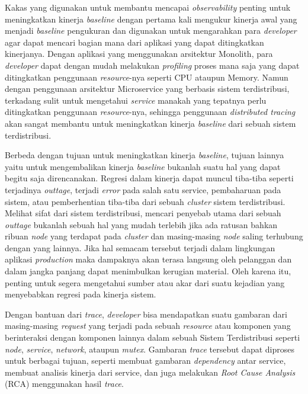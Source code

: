 Kakas yang digunakan untuk membantu mencapai \textit{observability} penting untuk meningkatkan kinerja \textit{baseline} dengan pertama kali mengukur kinerja awal yang menjadi \textit{baseline} pengukuran dan digunakan untuk mengarahkan para \textit{developer} agar dapat mencari bagian mana dari aplikasi yang dapat ditingkatkan kinerjanya. Dengan aplikasi yang menggunakan arsitektur Monolith, para \textit{developer} dapat dengan mudah melakukan \textit{profiling} proses mana saja yang dapat ditingkatkan penggunaan \textit{resource}-nya seperti CPU ataupun Memory. Namun dengan penggunaan arsitektur Microservice yang berbasis sistem terdistribusi, terkadang sulit untuk mengetahui \textit{service} manakah yang tepatnya perlu ditingkatkan penggunaan \textit{resource}-nya, sehingga penggunaan \textit{distributed tracing} akan sangat membantu untuk meningkatkan kinerja \textit{baseline} dari sebuah sistem terdistribusi.

Berbeda dengan tujuan untuk meningkatkan kinerja \textit{baseline}, tujuan lainnya yaitu untuk mengembalikan kinerja \textit{baseline} bukanlah suatu hal yang dapat begitu saja direncanakan. Regresi dalam kinerja dapat muncul tiba-tiba seperti terjadinya \textit{outtage}, terjadi \textit{error} pada salah satu service, pembaharuan pada sistem, atau pemberhentian tiba-tiba dari sebuah \textit{cluster} sistem terdistribusi. Melihat sifat dari sistem terdistribusi, mencari penyebab utama dari sebuah \textit{outtage} bukanlah sebuah hal yang mudah terlebih jika ada ratusan bahkan ribuan \textit{node} yang terdapat pada \textit{cluster} dan masing-masing \textit{node} saling terhubung dengan yang lainnya. Jika hal semacam tersebut terjadi dalam lingkungan aplikasi \textit{production} maka dampaknya akan terasa langsung oleh pelanggan dan dalam jangka panjang dapat menimbulkan kerugian material. Oleh karena itu, penting untuk segera mengetahui sumber atau akar dari suatu kejadian yang menyebabkan regresi pada kinerja sistem.

  Dengan bantuan dari \textit{trace}, \textit{developer} bisa mendapatkan suatu gambaran dari masing-masing \textit{request} yang terjadi pada sebuah \textit{resource} atau komponen yang berinteraksi dengan komponen lainnya dalam sebuah Sistem Terdistribusi seperti \textit{node}, \textit{service}, \textit{network}, ataupun \textit{mutex}. Gambaran \textit{trace} tersebut dapat diproses untuk berbagai tujuan, seperti membuat gambaran \textit{dependency} antar service, membuat analisis kinerja dari service, dan juga melakukan \textit{Root Cause Analysis} (RCA) menggunakan hasil \textit{trace}.
  
